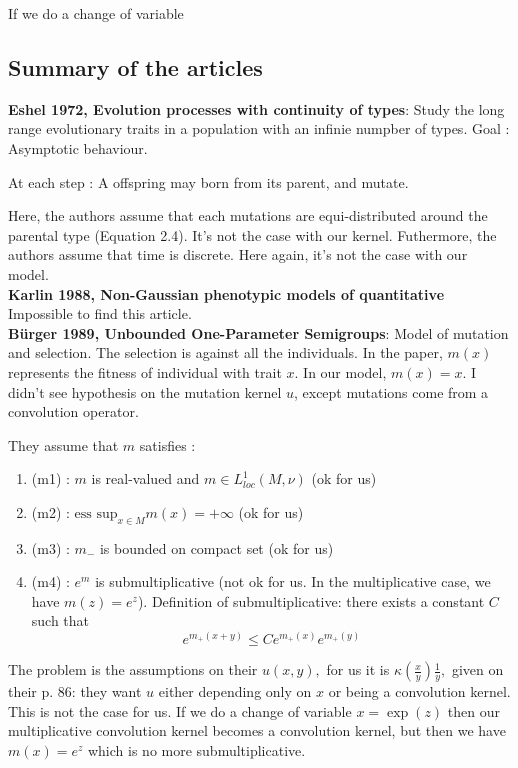 \documentclass{article}
\newcommand{\f}[2]{\frac{#1}{#2}}
\begin{document}
If we do a change of variable 
\subsection{Summary of the articles}

\textbf{Eshel 1972, Evolution processes with continuity of types}: Study the long range evolutionary traits in a population with an infinie numpber of types. Goal : Asymptotic behaviour. 

At each step : A offspring may born from its parent, and mutate. 

Here, the authors assume that each mutations are equi-distributed around the parental type (Equation 2.4). It's not the case with our kernel. Futhermore, the authors assume that time is discrete. Here again, it's not the case with our model. \\

\noindent\textbf{Karlin 1988, Non-Gaussian phenotypic models of quantitative}
Impossible to find this article. \\

\noindent\textbf{Bürger 1989, Unbounded One-Parameter Semigroups}: Model of mutation and selection. The selection is against all the individuals. In the paper, $m(x)$ represents the fitness of individual with trait $x$. In our model, $m(x) = x$. I didn't see hypothesis on the mutation kernel $u$, except mutations come from a convolution operator. 


They assume that $m$ satisfies :
\begin{enumerate}
    \item (m1) : $m$ is real-valued and $m \in L^1_{loc}(M, \nu)$ (ok for us)
    \item (m2) : $\text{ess sup}_{x \in M} m(x) = +\infty$ (ok for us)
    \item (m3) : $m_{-}$ is bounded on compact set (ok for us)
    \item (m4) : $e^m$ is submultiplicative (not ok for us. In the multiplicative case, we have $m(z) = e^{z}$). Definition of submultiplicative: there exists a constant $C$ such that
    \[ 
    e^{m_+(x+y)}\leq C e^{m_+(x)}e^{m_+(y)}\]
\end{enumerate}

The problem is the assumptions on their $u(x,y),$ for us it is $\kappa(\f{x}{y})\f{1}{y},$ given on their p. 86: they want $u$ either depending only on $x$ or being a convolution kernel. This is not the case for us. If we do a change of  variable $x=\exp(z)$ then our multiplicative convolution kernel becomes a convolution kernel, but then we have $m(x)=e^z$ which is no more submultiplicative. 
\end{document}
